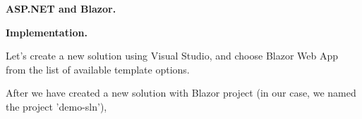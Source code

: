 
\pagebreak
\begin{center}
\textbf{ASP.NET and Blazor.}
\end{center}

\medskip


\textbf{Implementation.}

Let's create a new solution using Visual Studio, and choose Blazor Web App from the list of available template options.

After we have created a new solution with Blazor project (in our case, we named the project 'demo-sln'),


